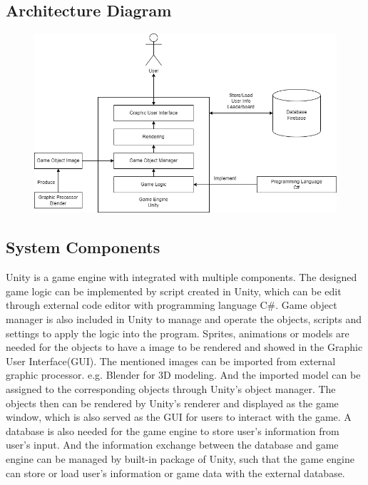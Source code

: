 \documentclass[11pt]{article}
\begin{document}
\subsection{Architecture Diagram}
\begin{figure}[H]
    \centering
    \includegraphics[width=0.8\linewidth]{ArchitectureDiagram.png}
\end{figure}
\subsection{System Components}
\par Unity is a game engine with integrated with multiple components. The designed game logic can be implemented by script created in Unity, which can be edit through external code editor with programming language C\#. Game object manager is also included in Unity to manage and operate the objects, scripts and settings to apply the logic into the program. Sprites, animations or models are needed for the objects to have a image to be rendered and showed in the Graphic User Interface(GUI). The mentioned images can be imported from external graphic processor. e.g. Blender for 3D modeling. And the imported model can be assigned to the corresponding objects through Unity's object manager. The objects then can be rendered by Unity's renderer and displayed as the game window, which is also served as the GUI for users to interact with the game. A database is also needed for the game engine to store user's information from user's input. And the information exchange between the database and game engine can be managed by built-in package of Unity, such that the game engine can store or load user's information or game data with the external database.
\end{document}
